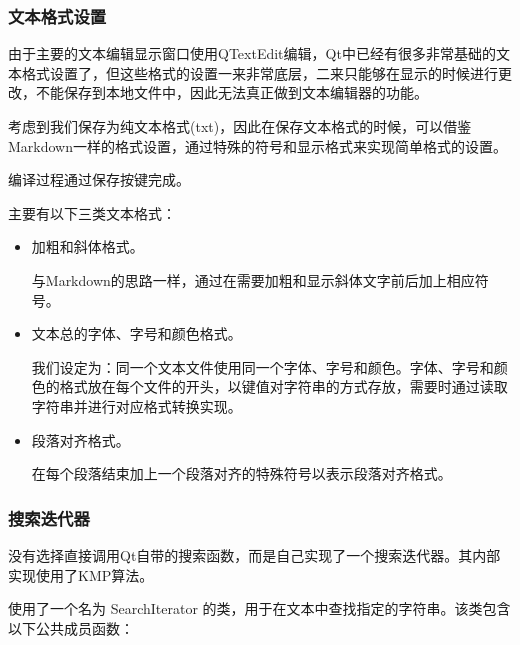 \documentclass{./source/Report}
\begin{document}
\subsubsection{文本格式设置}
由于主要的文本编辑显示窗口使用QTextEdit编辑，Qt中已经有很多非常基础的文本格式设置了，但这些格式的设置一来非常底层，二来只能够在显示的时候进行更改，不能保存到本地文件中，因此无法真正做到文本编辑器的功能。\par
考虑到我们保存为纯文本格式(txt)，因此在保存文本格式的时候，可以借鉴Markdown一样的格式设置，通过特殊的符号和显示格式来实现简单格式的设置。\par
编译过程通过保存按键完成。\par
主要有以下三类文本格式：
\begin{itemize}
    \item 加粗和斜体格式。\par
    与Markdown的思路一样，通过在需要加粗和显示斜体文字前后加上相应符号。
    \item 文本总的字体、字号和颜色格式。\par
    我们设定为：同一个文本文件使用同一个字体、字号和颜色。字体、字号和颜色的格式放在每个文件的开头，以键值对字符串的方式存放，需要时通过读取字符串并进行对应格式转换实现。
    \item 段落对齐格式。\par
    在每个段落结束加上一个段落对齐的特殊符号以表示段落对齐格式。
\end{itemize}



\subsubsection{搜索迭代器}
没有选择直接调用Qt自带的搜索函数，而是自己实现了一个搜索迭代器。其内部实现使用了KMP算法。\par

使用了一个名为 SearchIterator 的类，用于在文本中查找指定的字符串。该类包含以下公共成员函数：
\end{document}
